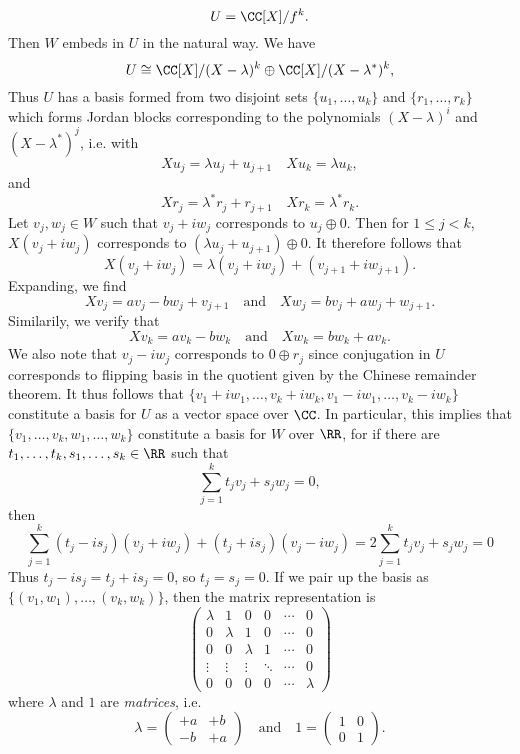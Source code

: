 \begin{example}
    \[ U = \CC[X]/f^k. \]
    Then $W$ embeds in $U$ in the natural way. We have
    \[ U \cong \CC[X]/(X - \lambda)^k \oplus \CC[X]/(X - \lambda^*)^k, \]
    Thus $U$ has a basis formed from two disjoint sets $\{ u_1, \dots, u_k \}$ and $\{ r_1, \dots, r_k \}$ which forms Jordan blocks corresponding to the polynomials $(X - \lambda)^i$ and $(X - \lambda^*)^j$, i.e. with
    \[ Xu_j = \lambda u_j + u_{j+1} \quad Xu_k = \lambda u_k, \]
    and
    \[ Xr_j = \lambda^* r_j + r_{j+1} \quad Xr_k = \lambda^* r_k. \]
    Let $v_j, w_j \in W$ such that $v_j + iw_j$ corresponds to $u_j \oplus 0$. Then for $1 \leq j < k$, $X(v_j + iw_j)$ corresponds to $(\lambda u_j + u_{j+1}) \oplus 0$. It therefore follows that
    \[ X(v_j + iw_j) = \lambda (v_j + iw_j) + (v_{j+1} + iw_{j+1}). \]
    Expanding, we find
    \[ Xv_j = av_j - b w_j + v_{j+1} \quad\text{and}\quad Xw_j = bv_j + aw_j + w_{j+1}. \]
    Similarily, we verify that
    \[ Xv_k = av_k - bw_k \quad\text{and}\quad Xw_k = bw_k + av_k. \]
    We also note that $v_j - iw_j$ corresponds to $0 \oplus r_j$ since conjugation in $U$ corresponds to flipping basis in the quotient given by the Chinese remainder theorem. It thus follows that $\{ v_1 + iw_1, \dots, v_k + iw_k, v_1 - iw_1, \dots, v_k - iw_k \}$ constitute a basis for $U$ as a vector space over $\CC$. In particular, this implies that $\{ v_1, \dots, v_k, w_1, \dots, w_k \}$ constitute a basis for $W$ over $\RR$, for if there are $t_1,\dots,t_k,s_1,\dots,s_k \in \RR$ such that
    \[ \sum_{j = 1}^k t_jv_j + s_jw_j = 0, \]
    then
    \[ \sum_{j = 1}^k (t_j - is_j)(v_j + iw_j) + (t_j + is_j)(v_j - iw_j) = 2 \sum_{j = 1}^k t_jv_j + s_jw_j = 0 \]
    Thus $t_j - is_j = t_j + is_j = 0$, so $t_j = s_j = 0$. If we pair up the basis as $\{ (v_1,w_1),\dots,(v_k,w_k) \}$, then the matrix representation is
    \[ \begin{pmatrix} \lambda & 1 & 0 & 0 & \cdots & 0 \\ 0 & \lambda & 1 & 0 & \cdots & 0 \\ 0 & 0 & \lambda & 1 & \cdots & 0 \\ \vdots & \vdots & \vdots & \ddots & \cdots & 0 \\ 0 & 0 & 0 & 0 & \cdots & \lambda \end{pmatrix} \]
    where $\lambda$ and $1$ are \emph{matrices}, i.e.
    \[ \lambda = \begin{pmatrix} +a & +b \\ -b & +a \end{pmatrix} \quad\text{and}\quad 1 = \begin{pmatrix} 1 & 0 \\ 0 & 1 \end{pmatrix}. \]

\end{example}
